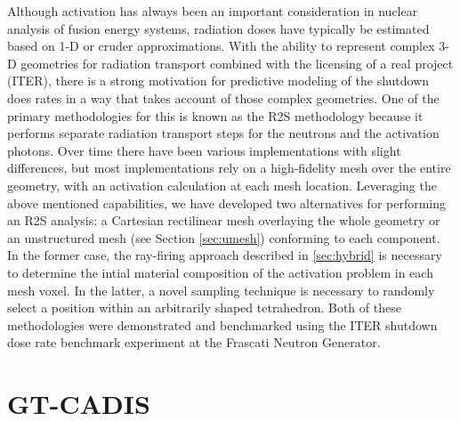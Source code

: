 Although activation has always been an important consideration in nuclear
analysis of fusion energy systems, radiation doses have typically be estimated
based on 1-D or cruder approximations.  With the ability to represent complex
3-D geometries for radiation transport combined with the licensing of a real
project (ITER), there is a strong motivation for predictive modeling of the
shutdown does rates in a way that takes account of those complex geometries.
One of the primary methodologies for this is known as the \gls{R2S}
methodology because it performs separate radiation transport steps for the
neutrons and the activation photons.  Over time there have been various
implementations with slight differences, but most implementations rely on a
high-fidelity mesh over the entire geometry, with an activation calculation at
each mesh location.  Leveraging the above mentioned capabilities, we have
developed two alternatives for performing an \gls{R2S} analysis: a Cartesian
rectilinear mesh overlaying the whole geometry or an unstructured mesh (see
Section \ref{sec:umesh}) conforming to each component.  In the former case,
the ray-firing approach described in \ref{sec:hybrid} is necessary to
determine the intial material composition of the activation problem in each
mesh voxel.  In the latter, a novel sampling technique is necessary to
randomly select a position within an arbitrarily shaped
tetrahedron. Both of these methodologies were
demonstrated and benchmarked using the ITER shutdown dose rate benchmark
experiment at the Frascati Neutron Generator.

\section{\acrfull{GT-CADIS}}

